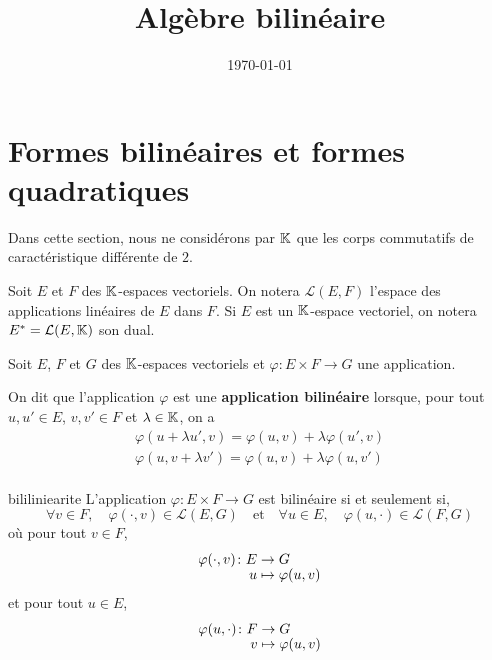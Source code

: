 \documentclass[a4paper,12pt]{article}
\title{ Algèbre bilinéaire }
\date{\today}
\begin{document}
\maketitle
\tableofcontents
\clearpage

\section{Formes bilinéaires et formes quadratiques}

Dans cette section, nous ne considérons par $\mathbb{K}$ que les corps commutatifs de caractéristique différente de $2$.

Soit $E$ et $F$ des $\mathbb{K}$-espaces vectoriels. On notera $\mathcal{L}(E, F)$ l'espace des applications linéaires de $E$ dans $F$.
Si $E$ est un $\mathbb{K}$-espace vectoriel, on notera $E^* = \mathcal{L}(E, \mathbb{K})$ son dual.

\begin{definition}
    Soit $E$, $F$ et $G$ des $\mathbb{K}$-espaces vectoriels et $\varphi: E \times F \to G$ une application.

    On dit que l'application $\varphi$ est une \textbf{application bilinéaire} lorsque, pour tout $u, u' \in E$, $v, v' \in F$ et $\lambda \in \mathbb{K}$, on a
    \begin{align*}  
        \varphi(u + \lambda u', v) = \varphi(u, v) + \lambda \varphi(u', v) \\
        \varphi(u, v + \lambda v') = \varphi(u, v) + \lambda \varphi(u, v') \\
    \end{align*}
\end{definition}

\begin{proposition}{}{bililiniearite}
    L'application $\varphi: E \times F \to G$ est bilinéaire si et seulement si,
    $$
    \forall v \in F, \quad \varphi(\cdot, v) \in \mathcal{L}(E, G) \quad \text{et} \quad \forall u \in E, \quad \varphi(u, \cdot) \in \mathcal{L}(F, G)
    $$
    où pour tout $v \in F$,
    $$
    \funcdef{\varphi(\cdot, v)}{E}{G}{u}{\varphi(u, v)}
    $$
    et pour tout $u \in E$,
    $$
    \funcdef{\varphi(u, \cdot)}{F}{G}{v}{\varphi(u, v)}
    $$
\end{proposition}
\end{document}
